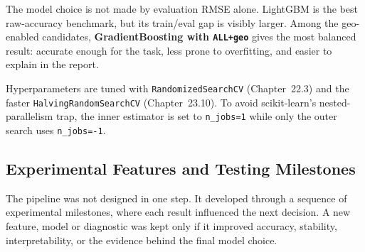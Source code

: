 \documentclass[11pt,a4paper]{article}
\begin{document}
The model choice is not made by evaluation RMSE alone. LightGBM is the best raw-accuracy benchmark, but its train/eval gap is visibly larger. Among the geo-enabled candidates, \textbf{GradientBoosting with \texttt{ALL+geo}} gives the most balanced result: accurate enough for the task, less prone to overfitting, and easier to explain in the report.

Hyperparameters are tuned with \texttt{RandomizedSearchCV} (Chapter~22.3) and the faster \texttt{HalvingRandomSearchCV} (Chapter~23.10). To avoid scikit-learn's nested-parallelism trap, the inner estimator is set to \texttt{n\_jobs=1} while only the outer search uses \texttt{n\_jobs=-1}.

\subsection{Experimental Features and Testing Milestones}
The pipeline was not designed in one step. It developed through a sequence of experimental milestones, where each result influenced the next decision. A new feature, model or diagnostic was kept only if it improved accuracy, stability, interpretability, or the evidence behind the final model choice.
\end{document}
